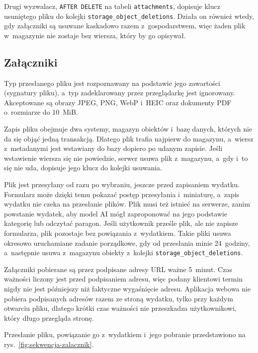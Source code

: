 Drugi wyzwalacz, \texttt{AFTER DELETE} na tabeli \texttt{attachments}, dopisuje klucz usuniętego pliku do kolejki \texttt{storage\_object\_deletions}. Działa on również wtedy, gdy załączniki są usuwane kaskadowo razem z~gospodarstwem, więc żaden plik w~magazynie nie zostaje bez wiersza, który by go opisywał.

\subsection{Załączniki}

Typ przesłanego pliku jest rozpoznawany na podstawie jego zawartości (sygnatury pliku), a~typ zadeklarowany przez przeglądarkę jest ignorowany. Akceptowane są obrazy JPEG, PNG, WebP i~HEIC oraz dokumenty PDF o~rozmiarze do 10~MiB.

Zapis pliku obejmuje dwa systemy, magazyn obiektów i~bazę danych, których nie da się objąć jedną transakcją. Dlatego plik trafia najpierw do magazynu, a~wiersz z~metadanymi jest wstawiany do bazy dopiero po udanym zapisie. Jeśli wstawienie wiersza się nie powiedzie, serwer usuwa plik z~magazynu, a~gdy i~to się nie uda, dopisuje jego klucz do kolejki usuwania.

Plik jest przesyłany od razu po wybraniu, jeszcze przed zapisaniem wydatku. Formularz może dzięki temu pokazać postęp przesyłania i~miniaturę, a~zapis wydatku nie czeka na przesłanie plików. Plik musi też istnieć na serwerze, zanim powstanie wydatek, aby model AI mógł zaproponować na jego podstawie kategorię lub odczytać paragon. Jeśli użytkownik prześle plik, ale nie zapisze formularza, plik pozostaje bez powiązania z~wydatkiem. Takie pliki usuwa okresowo uruchamiane zadanie porządkowe, gdy od przesłania minie 24~godziny, a~następnie usuwa z~magazynu obiekty z~kolejki \texttt{storage\_object\_deletions}.

Załączniki pobierane są przez podpisane adresy URL ważne 5~minut. Czas ważności liczony jest przed podpisaniem adresu, więc podany klientowi termin nigdy nie jest późniejszy niż faktyczne wygaśnięcie adresu. Aplikacja webowa nie pobiera podpisanych adresów razem ze stroną wydatku, tylko przy każdym otwarciu pliku, dlatego krótki czas ważności nie przeszkadza użytkownikowi, który długo przegląda stronę.

Przesłanie pliku, powiązanie go z~wydatkiem i~jego pobranie przedstawiono na rys.~\ref{fig:sekwencja-zalacznik}.

